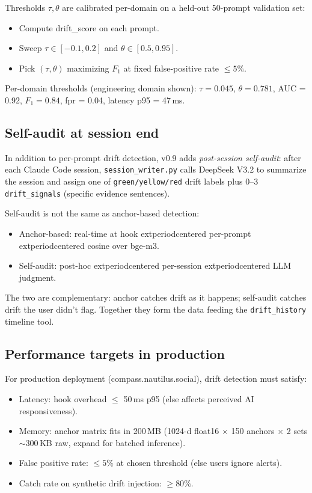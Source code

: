Thresholds $\tau, \theta$ are calibrated per-domain on a held-out
50-prompt validation set:

\begin{itemize}
\item Compute drift\_score on each prompt.
\item Sweep $\tau \in [-0.1, 0.2]$ and $\theta \in [0.5, 0.95]$.
\item Pick $(\tau, \theta)$ maximizing $F_1$ at fixed false-positive
  rate $\le 5\%$.
\end{itemize}

Per-domain thresholds (engineering domain shown):
$\tau = 0.045$, $\theta = 0.781$, AUC = 0.92, $F_1 = 0.84$,
fpr = 0.04, latency p95 = 47\,ms.

\subsection{Self-audit at session end}

In addition to per-prompt drift detection, \compass{} v0.9 adds
\emph{post-session self-audit}: after each Claude Code session,
\texttt{session\_writer.py} calls DeepSeek V3.2 to summarize the
session and assign one of \texttt{green/yellow/red} drift labels
plus 0--3 \texttt{drift\_signals} (specific evidence sentences).

Self-audit is not the same as anchor-based detection:

\begin{itemize}
\item Anchor-based: real-time at hook 	extperiodcentered{}  per-prompt 	extperiodcentered{}  cosine over
  bge-m3.
\item Self-audit: post-hoc 	extperiodcentered{}  per-session 	extperiodcentered{}  LLM judgment.
\end{itemize}

The two are complementary: anchor catches drift as it happens;
self-audit catches drift the user didn't flag. Together they form
the data feeding the \texttt{drift\_history} timeline tool.

\subsection{Performance targets in production}

For production deployment (compass.nautilus.social), drift detection
must satisfy:

\begin{itemize}
\item Latency: hook overhead $\le$ 50\,ms p95 (else affects
  perceived AI responsiveness).
\item Memory: anchor matrix fits in 200\,MB (1024-d float16 $\times$
  150 anchors $\times$ 2 sets $\sim$300\,KB raw, expand for batched
  inference).
\item False positive rate: $\le 5\%$ at chosen threshold (else users
  ignore alerts).
\item Catch rate on synthetic drift injection: $\ge 80\%$.
\end{itemize}

